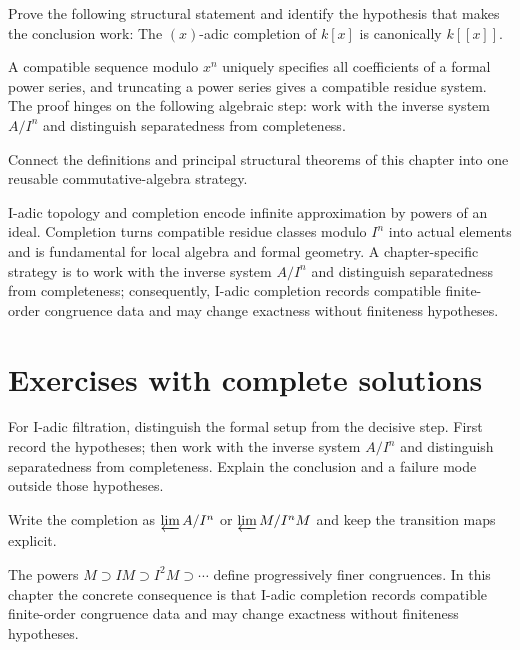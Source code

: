 \begin{problem}\label{prob:v18-problem-11}
Prove the following structural statement and identify the hypothesis that makes the conclusion work: The $(x)$-adic completion of $k[x]$ is canonically $k[[x]]$.
\end{problem}
\begin{solution}
A compatible sequence modulo $x^n$ uniquely specifies all coefficients of a formal power series, and truncating a power series gives a compatible residue system. The proof hinges on the following algebraic step: work with the inverse system \(A/I^n\) and distinguish separatedness from completeness.
\end{solution}

\begin{problem}\label{prob:v18-problem-12}
Connect the definitions and principal structural theorems of this chapter into one reusable commutative-algebra strategy.
\end{problem}
\begin{solution}
I-adic topology and completion encode infinite approximation by powers of an ideal. Completion turns compatible residue classes modulo $I^n$ into actual elements and is fundamental for local algebra and formal geometry. A chapter-specific strategy is to work with the inverse system \(A/I^n\) and distinguish separatedness from completeness; consequently, I-adic completion records compatible finite-order congruence data and may change exactness without finiteness hypotheses.
\end{solution}

\section{Exercises with complete solutions}

\begin{exercise}\label{exr:v18-01}
For I-adic filtration, distinguish the formal setup from the decisive step. First record the hypotheses; then work with the inverse system \(A/I^n\) and distinguish separatedness from completeness. Explain the conclusion and a failure mode outside those hypotheses.
\end{exercise}
\begin{hint}
Write the completion as \(\varprojlim A/I^n\) or \(\varprojlim M/I^nM\) and keep the transition maps explicit.
\end{hint}
\begin{solution}
The powers $M\supset IM\supset I^2M\supset\cdots$ define progressively finer congruences. In this chapter the concrete consequence is that I-adic completion records compatible finite-order congruence data and may change exactness without finiteness hypotheses.
\end{solution}

